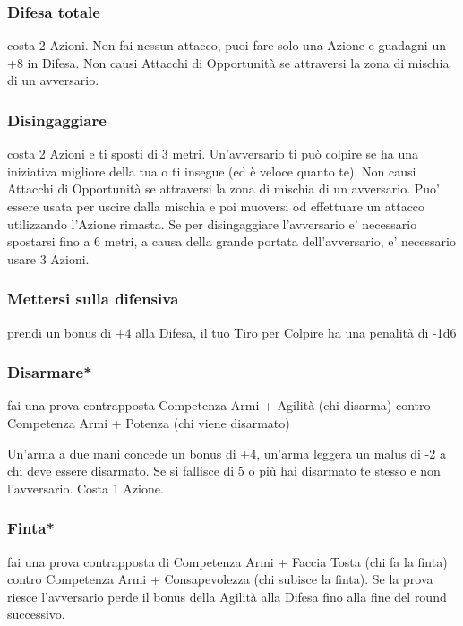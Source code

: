\documentclass[a4paper,11pt,twoside,openany]{book}
\begin{document}
\subsubsection{Difesa totale} costa 2 Azioni. Non fai nessun attacco, puoi fare solo una Azione e guadagni un +8 in Difesa. Non causi Attacchi di Opportunità se attraversi la zona di mischia di un avversario.

\subsubsection{Disingaggiare} costa 2 Azioni e ti sposti di 3 metri. Un'avversario ti può colpire se ha una iniziativa migliore della tua o ti insegue (ed è veloce quanto te). Non causi Attacchi di Opportunità se attraversi la zona di mischia di un avversario. Puo' essere usata per uscire dalla mischia e poi muoversi od effettuare un attacco utilizzando l'Azione rimasta.
Se per disingaggiare l'avversario e' necessario spostarsi fino a 6 metri, a causa della grande portata dell'avversario, e' necessario usare 3 Azioni.

\subsubsection{Mettersi sulla difensiva} prendi un bonus di +4 alla Difesa, il tuo Tiro per Colpire ha una penalità di -1d6

\subsubsection{Disarmare*} fai una prova contrapposta Competenza Armi + Agilità (chi disarma) contro Competenza Armi + Potenza (chi viene disarmato)

Un'arma a due mani concede un bonus di +4, un'arma leggera un malus di -2 a chi deve essere disarmato. Se si fallisce di 5 o più hai disarmato te stesso e non l'avversario. Costa 1 Azione.

\subsubsection{Finta*} fai una prova contrapposta di Competenza Armi + Faccia Tosta (chi fa la finta) contro Competenza Armi + Consapevolezza (chi subisce la finta). Se la prova riesce l'avversario perde il bonus della Agilità alla Difesa fino alla fine del round successivo.
\end{document}
